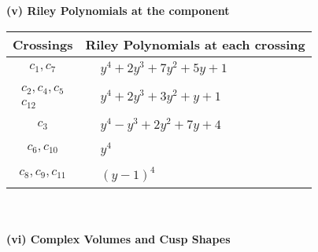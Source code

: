 \documentclass[1p]{elsarticle_modified}
\theoremstyle{definition}
\begin{document}
\newpage\renewcommand{\arraystretch}{1}
\flushleft \textbf{(v) Riley Polynomials at the component}\newline \\
\begin{tabular}{m{50pt}|m{274pt}}
Crossings & \hspace{64pt}Riley Polynomials at each crossing \\
\hline $$\begin{aligned}c_{1},c_{7}\end{aligned}$$&$\begin{aligned}
&y^4+2 y^3+7 y^2+5 y+1
\end{aligned}$\\
\hline $$\begin{aligned}c_{2},c_{4},c_{5}\\c_{12}\end{aligned}$$&$\begin{aligned}
&y^4+2 y^3+3 y^2+y+1
\end{aligned}$\\
\hline $$\begin{aligned}c_{3}\end{aligned}$$&$\begin{aligned}
&y^4- y^3+2 y^2+7 y+4
\end{aligned}$\\
\hline $$\begin{aligned}c_{6},c_{10}\end{aligned}$$&$\begin{aligned}
&y^4
\end{aligned}$\\
\hline $$\begin{aligned}c_{8},c_{9},c_{11}\end{aligned}$$&$\begin{aligned}
&(y-1)^4
\end{aligned}$\\
\hline
\end{tabular}\\~\\
\newpage\flushleft \textbf{(vi) Complex Volumes and Cusp Shapes}
\end{document}
